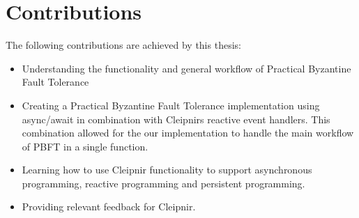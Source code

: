 \section{Contributions}
The following contributions are achieved by this thesis:
\begin{itemize}
\item Understanding the functionality and general workflow of Practical Byzantine Fault Tolerance
\item Creating a Practical Byzantine Fault Tolerance implementation using async/await in combination with Cleipnirs reactive event handlers. This combination allowed for the our implementation to handle the main workflow of PBFT in a single function.
\item Learning how to use Cleipnir functionality to support asynchronous programming, reactive programming and persistent programming.
\item Providing relevant feedback for Cleipnir.
\end{itemize}

